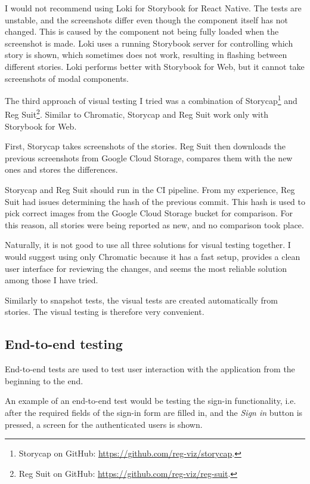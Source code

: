 \documentclass[
  digital, %
  table,   %
  oneside, %
  lof,     %
  lot,     %
]{fithesis3}
\begin{document}
I would not recommend using Loki for Storybook for React Native. The tests are unstable, and the screenshots differ even though the component itself has not changed. This is caused by the component not being fully loaded when the screenshot is made. Loki uses a running Storybook server for controlling which story is shown, which sometimes does not work, resulting in flashing between different stories.
Loki performs better with Storybook for Web, but it cannot take screenshots of modal components.

The third approach of visual testing I tried was a combination of Storycap\footnote{Storycap on GitHub: \url{https://github.com/reg-viz/storycap}.} and Reg Suit\footnote{Reg Suit on GitHub: \url{https://github.com/reg-viz/reg-suit}.}. Similar to Chromatic, Storycap and Reg Suit work only with Storybook for Web.

First, Storycap takes screenshots of the stories. Reg Suit then downloads the previous screenshots from Google Cloud Storage, compares them with the new ones and stores the differences. 

Storycap and Reg Suit should run in the CI pipeline. From my experience, Reg Suit had issues determining the hash of the previous commit. This hash is used to pick correct images from the Google Cloud Storage bucket for comparison. For this reason, all stories were being reported as new, and no comparison took place.

Naturally, it is not good to use all three solutions for visual testing together. I would suggest using only Chromatic because it has a fast setup, provides a clean user interface for reviewing the changes, and seems the most reliable solution among those I have tried.

Similarly to snapshot tests, the visual tests are created automatically from stories. The visual testing is therefore very convenient.

\subsection{End-to-end testing}
\label{sec:end_to_end_testing}
End-to-end tests are used to test user interaction with the application from the beginning to the end. 

An example of an end-to-end test would be testing the sign-in functionality, i.e. after the required fields of the sign-in form are filled in, and the \textit{Sign in} button is pressed, a screen for the authenticated users is shown.
\end{document}
